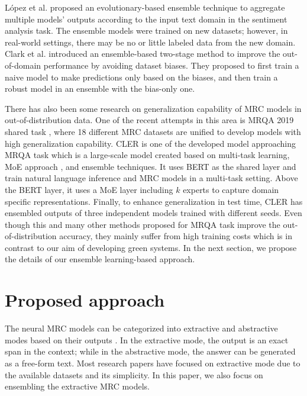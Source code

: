 \documentclass[review]{elsarticle}
\begin{document}
López et al. \cite{RN228} proposed an evolutionary-based ensemble technique to aggregate multiple models' outputs according to the input text domain in the sentiment analysis task. The ensemble models were trained on new datasets; however, in real-world settings, there may be no or little labeled data from the new domain.
Clark et al. \cite{clark-etal-2019-dont} introduced an ensemble-based two-stage method to improve the out-of-domain performance by avoiding dataset biases. They proposed to first train a naive model to make predictions only based on the biases, and then train a robust model in an ensemble with the bias-only one. 


There has also been some research on generalization capability of MRC models in out-of-distribution data. One of the recent attempts in this area is MRQA 2019 shared task \citep{RN230}, where 18 different MRC datasets are unified to develop models with high generalization capability. CLER \cite{RN231} is one of the developed model approaching MRQA task which is a large-scale model created based on multi-task learning, MoE approach \cite{RN227}, and ensemble techniques. It uses BERT \cite{devlin2018bert} as the shared layer and train natural language inference and MRC models in a multi-task setting. Above the BERT layer, it uses a MoE layer including $k$ experts to capture domain specific representations. Finally, to enhance generalization in test time, CLER has ensembled outputs of three independent models trained with different seeds. 
Even though this and many other methods proposed for MRQA task improve the out-of-distribution accuracy, they mainly suffer from high training costs which is in contrast to our aim of developing green systems. In the next section, we propose the details of our ensemble learning-based approach. 


\section{Proposed approach}
The neural MRC models can be categorized into extractive and abstractive modes based on their outputs \cite{RN249}. In the extractive mode, the output is an exact span in the context; while in the abstractive mode, the answer can be generated as a free-form text. Most research papers have focused on extractive mode due to the available datasets and its simplicity. In this paper, we also focus on ensembling the extractive MRC models.
\end{document}

